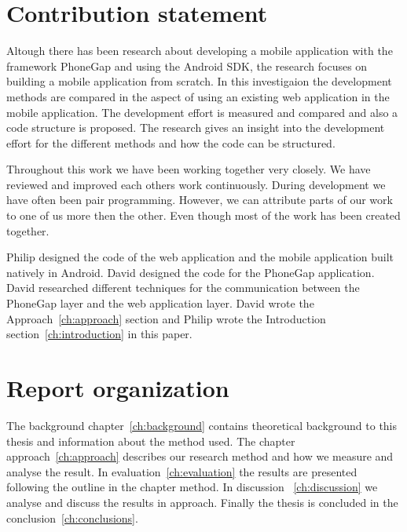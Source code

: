 \section{Contribution statement}\label{sec:contribution-statement}
Altough there has been research about developing a mobile application with the framework PhoneGap and using the Android SDK, the research focuses on building a mobile application from scratch. In this investigaion the development methods are compared in the aspect of using an existing web application in the mobile application. The development effort is measured and compared and also a code structure is proposed. The research gives an insight into the development effort for the different methods and how the code can be structured.

Throughout this work we have been working together very closely. We have reviewed and improved each others work continuously. During development we have often been pair programming. However, we can attribute parts of our work to one of us more then the other. Even though most of the work has been created together.

Philip designed the code of the web application and the mobile application built natively in Android. David designed the code for the PhoneGap application. David researched different techniques for the communication between the PhoneGap layer and the web application layer. David wrote the Approach~\ref{ch:approach} section and Philip wrote the Introduction section~\ref{ch:introduction} in this paper.

\section{Report organization}\label{sec:report-organization}
The background chapter~\ref{ch:background} contains theoretical background to this thesis and information about the method used. The chapter approach~\ref{ch:approach} describes our research method and how we measure and analyse the result. In evaluation~\ref{ch:evaluation} the results are presented following the outline in the chapter method. In discussion ~\ref{ch:discussion} we analyse and discuss the results in approach. Finally the thesis is concluded in the conclusion~\ref{ch:conclusions}.
